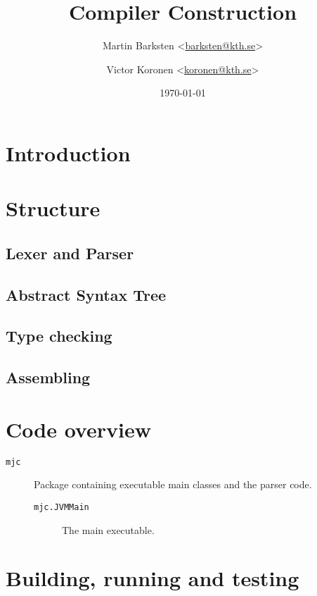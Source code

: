 \documentclass[a4paper]{article}
\title{Compiler Construction}
\author{%
    Martin Barksten <\href{mailto:barksten@kth.se}{barksten@kth.se}> \and
    Victor Koronen <\href{mailto:koronen@kth.se}{koronen@kth.se}>
}
\date{\today}
\begin{document}
\maketitle
\thispagestyle{empty}

\section{Introduction}

\section{Structure}

\subsection{Lexer and Parser}
\subsection{Abstract Syntax Tree}
\subsection{Type checking}
\subsection{Assembling}

\section{Code overview}

\begin{description}
\item[\texttt{mjc}] Package containing executable main classes and the parser
    code.
    \begin{description}
        \item[\texttt{mjc.JVMMain}] The main executable.
    \end{description}
\end{description}

\section{Building, running and testing}
\end{document}
